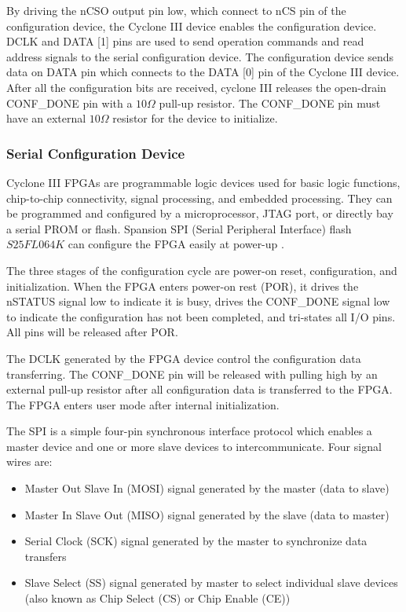 By driving the nCSO output pin low, which connect to nCS pin of the configuration device, the Cyclone III device enables the configuration device.  DCLK and DATA [1] pins are used to send operation commands and read address signals to the serial configuration device. The configuration device sends data on DATA pin which connects to the DATA [0] pin of the Cyclone III device. After all the configuration bits are received, cyclone III releases the open-drain CONF\_DONE pin with a $10\Omega$ pull-up resistor. The CONF\_DONE pin must have an external $10\Omega$ resistor for the device to initialize.





\subsubsection{Serial Configuration Device}

Cyclone III FPGAs are programmable logic devices used for basic logic functions, chip-to-chip connectivity, signal processing, and embedded processing. They can be programmed and configured by a microprocessor, JTAG port, or directly bay a serial PROM or flash. Spansion SPI (Serial Peripheral Interface) flash $S25FL064K$ can configure the FPGA easily at power-up \citep{Spansion:2011:appnote}.

The three stages of the configuration cycle are power-on reset, configuration, and initialization. When the FPGA enters power-on rest (POR), it drives the nSTATUS signal low to indicate it is busy, drives the CONF\_DONE signal low to indicate the configuration has not been completed, and tri-states all I/O pins. All pins will be released after POR.

The DCLK generated by the FPGA device control the configuration data transferring. The CONF\_DONE pin will be released with pulling high by an external pull-up resistor after all configuration data is transferred to the FPGA. The FPGA enters user mode after internal initialization.

The SPI is a simple four-pin synchronous interface protocol which enables a master device and one or more slave devices to intercommunicate. Four signal wires are:
\begin{itemize}
 \item Master Out Slave In (MOSI) signal generated by the master (data to slave)
 \item Master In Slave Out (MISO) signal generated by the slave (data to master)
 \item Serial Clock (SCK) signal generated by the master to synchronize data transfers
 \item Slave Select (SS) signal generated by master to select individual slave devices (also known as Chip Select (CS) or Chip Enable (CE))
\end{itemize}


